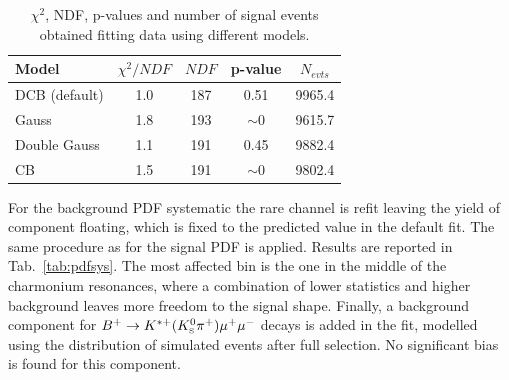 \begin{center}
\begin{table}[h]
\centering
\caption{$\chi^2$, NDF, p-values and number of signal events obtained fitting \Lb\to\jpsi\Lz data using different models.}
\begin{tabular}{lcccc}
\hline
Model   		& $\chi^2/NDF$  & $NDF$  & p-value  & $N_{evts}$ \\ \hline
DCB  (default)	&    1.0   &   187   &    0.51      & 9965.4  \\
Gauss			&    1.8   &   193   &    $\sim 0$  & 9615.7 \\
Double Gauss  	&    1.1   &   191   &    0.45      & 9882.4  \\
CB  			&    1.5   &   191   &    $\sim 0$  & 9802.4 \\
\hline
\end{tabular}
\label{PDFsys}
\end{table}
\end{center}

For the background PDF systematic the rare channel is refit leaving the yield of \KS component floating,
which is fixed to the predicted value in the default fit. The same procedure as for the signal PDF is applied.
Results are reported in Tab.~\ref{tab:pdfsys}. The most affected bin is the one in the middle of the charmonium
resonances, where a combination of lower statistics and higher background leaves more freedom to the signal shape.
Finally, a background component for $B^{+} \ra K^{*+}(\KS\pi^+)\mumu$ decays is added in the fit, modelled using
the distribution of simulated events after full selection. No significant bias is found for this component.

